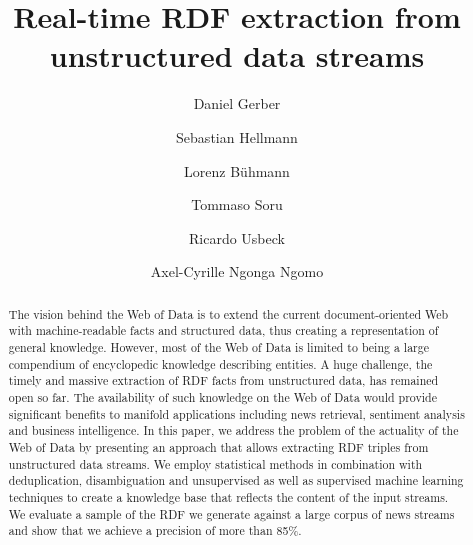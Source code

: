 \documentclass[a4paper]{llncs}
\begin{document}
\title{Real-time RDF extraction from unstructured data streams}

\author{Daniel Gerber \and Sebastian Hellmann \and Lorenz Bühmann \and Tommaso Soru \and Ricardo Usbeck \and Axel-Cyrille Ngonga Ngomo}


\maketitle            %

\begin{abstract}
The vision behind the Web of Data is to extend the current document-oriented Web with machine-readable facts and structured data, thus creating a representation of general knowledge.
However, most of the Web of Data is limited to being a large compendium of encyclopedic knowledge describing entities.
A huge challenge, the timely and massive extraction of RDF facts from unstructured data, has remained open so far. 
The availability of such knowledge on the Web of Data would provide significant benefits to manifold applications including news retrieval, sentiment analysis and business intelligence.
In this paper, we address the problem of the actuality of the Web of Data by presenting an approach that allows extracting RDF triples from unstructured data streams.
We employ statistical methods in combination with deduplication, disambiguation and unsupervised as well as supervised machine learning techniques to create a knowledge base that reflects the content of the input streams.
We evaluate a sample of the RDF we generate against a large corpus of news streams and show that we achieve a precision of more than 85\%.
\end{abstract}         
\end{document}
